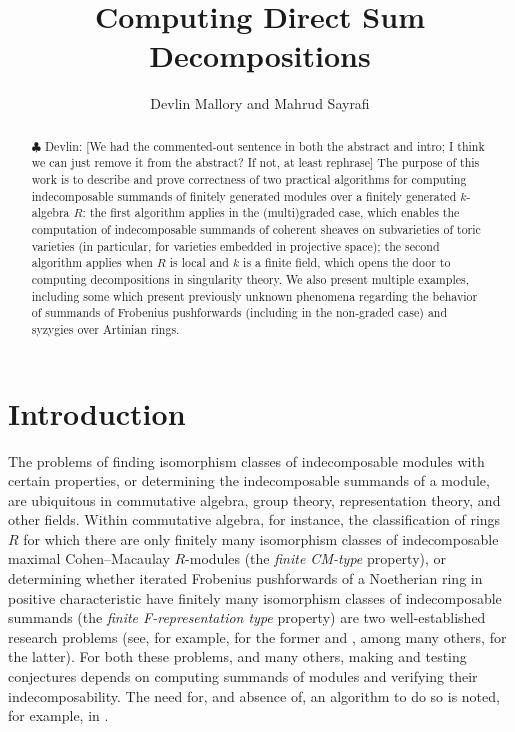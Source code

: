 \documentclass[12pt]{article}
\title{Computing Direct Sum Decompositions}
\author{Devlin Mallory and Mahrud Sayrafi}
\theoremstyle{theorem}
\numberwithin{thm}{section}
\theoremstyle{definition}
\newcommand{\devlin}[1]{{\color{red} \sf $\clubsuit$ Devlin: [#1]}}
\begin{document}
\maketitle

\begin{abstract}
  \devlin{We had the commented-out sentence in both the abstract and intro; I think we can just remove it from the abstract? If not, at least rephrase}
  The purpose of this work is to describe and prove correctness of two practical algorithms for computing indecomposable summands of finitely generated modules over a finitely generated $k$-algebra $R$: the first algorithm applies in the (multi)graded case, which enables the computation of indecomposable summands of coherent sheaves on subvarieties of toric varieties (in particular, for varieties embedded in projective space); the second algorithm applies when $R$ is local and $k$ is a finite field, which opens the door to computing decompositions in singularity theory. We also present multiple examples, including some which present previously unknown phenomena regarding the behavior of summands of Frobenius pushforwards (including in the non-graded case) and syzygies over Artinian rings.
\end{abstract}



\section{Introduction}
\label{sec:intro}

The problems of finding isomorphism classes of indecomposable modules with certain properties, or determining the indecomposable summands of a module, are ubiquitous in commutative algebra, group theory, representation theory, and other fields. Within commutative algebra, for instance, the classification of rings $R$ for which there are only finitely many isomorphism classes of indecomposable maximal Cohen--Macaulay $R$-modules (the \emph{finite CM-type} property), or determining whether iterated Frobenius pushforwards of a Noetherian ring in positive characteristic have finitely many isomorphism classes of indecomposable summands (the \emph{finite F-representation type} property) are two well-established research problems (see, for example, \cite{Yoshino90,LW12} for the former and \cite{SVdB97,Hara15,TT08}, among many others, for the latter). For both these problems, and many others, making and testing conjectures depends on computing summands of modules and verifying their indecomposability.
The need for, and absence of, an algorithm to do so is noted, for example, in
\cite[15.10.9]{Eisenbud95}.
\end{document}
